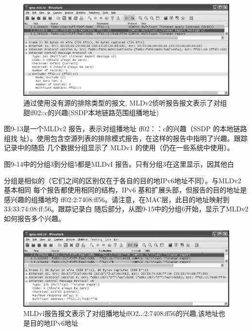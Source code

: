 \begin{figure}[ht]
    \centering
	\includegraphics[width=1.0\textwidth]{imgs/9/9-13.png}
	\caption{通过使用没有源的排除类型的报文, MLDv2侦听报告报文表示了对组甜ff02::c的兴趣(SSDP本地链路范围组播地址)}
\end{figure}

图9-13是一个MLDv2 报告，表示对组播地址 ff02：：c的兴趣（SSDP 的本地链路组找
址）。使用包含空源列表的排除模式报告，在这样的报告中指明了兴趣。跟踪记录中的随启
几个数据分组显示了 MLDv1 的使用（仍在一些系统中使用）。

图9-14中的分组3到分组5都是MLDvI 报告。只有分组3在这里显示，因其他白

分组是相似的（它们之间的区别仅在于各自的目的地IPv6地址不同）。与MLDv2 基本相同
每个报告都使用相同的结构，IPv6 基和扩展头部，但报告的目的地址是感兴趣的组播地均
ff02:2:7408:ff56。请注意，在MAC层，此目的地址映射到 33:33:74:08:ff:56。跟踪记录白
随后部分，从图9-15中的分组6开始，显示了MLDv2如何报告多个兴趣。
\begin{figure}[ht]
    \centering
	\includegraphics[width=1.0\textwidth]{imgs/9/9-14.png}
	\caption{MLDvl报告报文表示了对组播地址ffO2‥:2:7408:ff56的兴趣,该地址也是目的地IPv6地址}
\end{figure}

